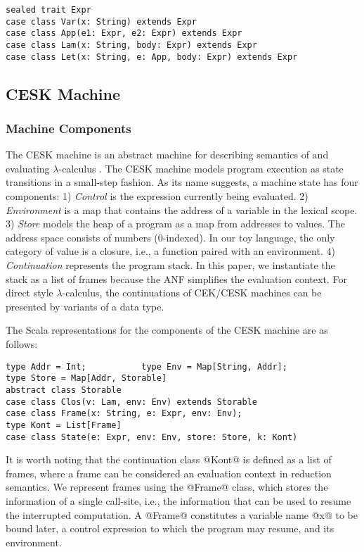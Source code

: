 \documentclass[acmsmall]{acmart}\settopmatter{}
\begin{document}
\begin{lstlisting}
sealed trait Expr
case class Var(x: String) extends Expr
case class App(e1: Expr, e2: Expr) extends Expr
case class Lam(x: String, body: Expr) extends Expr
case class Let(x: String, e: App, body: Expr) extends Expr
\end{lstlisting}

\subsection{CESK Machine} \label{cesk}

\subsubsection{Machine Components}

The CESK machine is an abstract machine for describing semantics of and evaluating 
$\lambda$-calculus \cite{felleisen1987calculus}. The CESK machine models program execution 
as state transitions in a small-step fashion. As its name suggests, a machine state has 
four components:
1) \textit{Control} is the expression currently being evaluated.
2) \textit{Environment} is a map that contains the address of a variable in the lexical scope.
3) \textit{Store} models the heap of a program as a map from addresses to values.
  The address space consists of numbers (0-indexed).
  In our toy language, the only category of value is a closure, i.e., a function paired with
  an environment.
4) \textit{Continuation} represents the program stack. In this paper, we instantiate the 
  stack as a list of frames because the ANF simplifies the evaluation context. For direct 
  style $\lambda$-calculus, the continuations of CEK/CESK machines can be presented by
  variants of a data type.

The Scala representations for the components of the CESK machine are as follows:

\begin{lstlisting}
type Addr = Int;           type Env = Map[String, Addr];           type Store = Map[Addr, Storable]
abstract class Storable
case class Clos(v: Lam, env: Env) extends Storable
case class Frame(x: String, e: Expr, env: Env);                    type Kont = List[Frame]
case class State(e: Expr, env: Env, store: Store, k: Kont)
\end{lstlisting}

It is worth noting that the continuation class @Kont@ is defined as a list of
frames, where a frame can be considered an evaluation context in reduction semantics.
We represent frames using the @Frame@ class, which stores the information of a single
call-site, i.e., the information that can be used to resume the interrupted computation.
A @Frame@ constitutes a variable name @x@ to be bound later, a control expression
to which the program may resume, and its environment.
\end{document}
